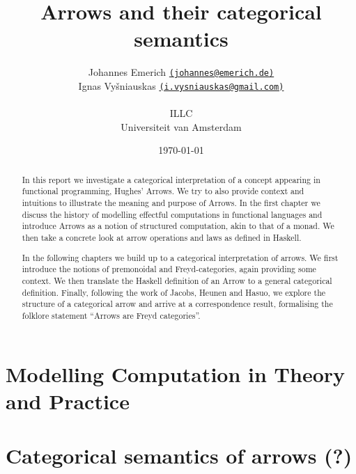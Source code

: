 \documentclass[12pt,a4paper,titlepage]{scrreprt}
\title{Arrows and their categorical semantics}
\author{
    Johannes Emerich
        \href{mailto:johannes@emerich.de}{
        \normalsize \texttt{(johannes@emerich.de)}}\\
    Ignas Vyšniauskas
        \href{mailto:i.vysniauskas@gmail.com}{
        \normalsize \texttt{(i.vysniauskas@gmail.com)}}\\
\\
  ILLC \\
  Universiteit van Amsterdam
}
\date{\today}
\theoremstyle{definition}
\theoremstyle{plain}
\begin{document}
\maketitle

\begin{abstract}
    In this report we investigate a categorical interpretation of a concept
    appearing in functional programming, Hughes' Arrows. We try to also provide
    context and intuitions to illustrate the meaning and purpose of Arrows.  In
    the first chapter we discuss the history of modelling effectful computations
    in functional languages and introduce Arrows as a notion of structured
    computation, akin to that of a monad. We then take a concrete look at arrow
    operations and laws as defined in Haskell.

    In the following chapters we build up to a categorical interpretation of
    arrows. We first introduce the notions of premonoidal and Freyd-categories,
    again providing some context. We then translate the Haskell definition of an
    Arrow to a general categorical definition. Finally, following the work of
    Jacobs, Heunen and Hasuo, we explore the structure of a categorical arrow
    and arrive at a correspondence result, formalising the folklore statement
    ``Arrows are Freyd categories''.
\end{abstract}


\chapter{Modelling Computation in Theory and Practice}
    
    
\chapter{Categorical semantics of arrows (?)}
    
    
    

\nocite{mustard}
\printbibliography
\end{document}
